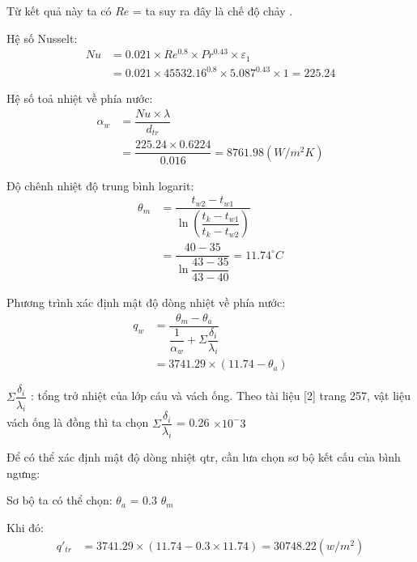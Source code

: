 Từ kết quả này ta có $ Re $ =  ta suy ra đây là chế độ chảy .

Hệ số Nusselt:
\begin{equation*}
	\begin{split}
		Nu &= 0.021\times Re^{0.8} \times Pr^{0.43} \times\varepsilon_{1}\\
		&= 0.021 \times 45532.16^0.8 \times 5.087^0.43 \times 1 = 225.24
	\end{split}
\end{equation*}

Hệ số toả nhiệt về phía nước:
\begin{equation*}
	\begin{split}
		\alpha_{w} &= \dfrac{Nu\times \lambda}{d_{tr}}\\
		&=\dfrac{225.24 \times 0.6224}{0.016} = 8761.98(W/m^2K)
	\end{split}
\end{equation*}

Độ chênh nhiệt độ trung bình logarit:
\begin{equation*}
	\begin{split}
		\theta_{m} &= \dfrac{t_{w2} - t_{w1}}{\ln\left(\dfrac{t_{k} - t_{w1}}{t_{k} - t_{w2}}\right)}\\
		&=\dfrac{40-35}{\ln\dfrac{43-35}{43-40}}=11.74^{\circ}C
	\end{split}
\end{equation*}

Phương trình xác định mật độ dòng nhiệt về phía nước:
\begin{equation*}
	\begin{split}
		q_{w} &= \dfrac{\theta_{m} - \theta_{a}}{\dfrac{1}{\alpha_{w}}+\Sigma\dfrac{\delta_{i}}{\lambda_{i}}}\\
		&=3741.29 \times (11.74 - \theta_{a})
	\end{split}
\end{equation*}

$\Sigma\dfrac{\delta_{i}}{\lambda_{i}}$ : tổng trở nhiệt của lớp cáu và vách ống. Theo tài liệu [2] trang 257, vật liệu vách ống là đồng thì ta chọn $\Sigma\dfrac{\delta_{i}}{\lambda_{i}}$ = 0.26 $\times 10^-3$

Để có thể xác định mật độ dòng nhiệt qtr, cần lưa chọn sơ bộ kết cấu của bình ngưng:

Sơ bộ ta có thể chọn: $\theta_{a}$ = 0.3 $\theta_{m}$

Khi đó:
\begin{equation*}
	\begin{split}
		q'_{tr} &= 3741.29 \times (11.74 - 0.3 \times 11.74)=30748.22(w/m^2)
	\end{split}
\end{equation*}

